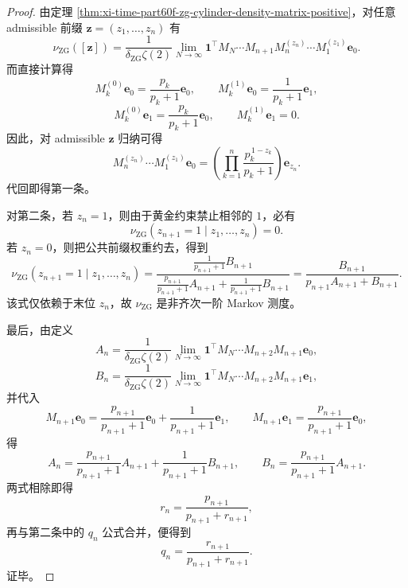 \begin{proof}
由定理 \ref{thm:xi-time-part60f-zg-cylinder-density-matrix-positive}，对任意 admissible 前缀 \(\mathbf z=(z_1,\dots,z_n)\) 有
\[
\nu_{\mathrm{ZG}}([\mathbf z])
=
\frac{1}{\delta_{\mathrm{ZG}}\zeta(2)}
\lim_{N\to\infty}
\mathbf 1^\top M_N\cdots M_{n+1}M_n^{(z_n)}\cdots M_1^{(z_1)}\mathbf e_0.
\]
而直接计算得
\[
M_k^{(0)}\mathbf e_0=\frac{p_k}{p_k+1}\mathbf e_0,\qquad
M_k^{(1)}\mathbf e_0=\frac{1}{p_k+1}\mathbf e_1,
\]
\[
M_k^{(0)}\mathbf e_1=\frac{p_k}{p_k+1}\mathbf e_0,\qquad
M_k^{(1)}\mathbf e_1=0.
\]
因此，对 admissible \(\mathbf z\) 归纳可得
\[
M_n^{(z_n)}\cdots M_1^{(z_1)}\mathbf e_0
=
\left(\prod_{k=1}^{n}\frac{p_k^{\,1-z_k}}{p_k+1}\right)\mathbf e_{z_n}.
\]
代回即得第一条。

对第二条，若 \(z_n=1\)，则由于黄金约束禁止相邻的 \(1\)，必有
\[
\nu_{\mathrm{ZG}}(z_{n+1}=1\mid z_1,\dots,z_n)=0.
\]
若 \(z_n=0\)，则把公共前缀权重约去，得到
\[
\nu_{\mathrm{ZG}}(z_{n+1}=1\mid z_1,\dots,z_n)
=
\frac{\frac{1}{p_{n+1}+1}B_{n+1}}
{\frac{p_{n+1}}{p_{n+1}+1}A_{n+1}+\frac{1}{p_{n+1}+1}B_{n+1}}
=
\frac{B_{n+1}}{p_{n+1}A_{n+1}+B_{n+1}}.
\]
该式仅依赖于末位 \(z_n\)，故 \(\nu_{\mathrm{ZG}}\) 是非齐次一阶 Markov 测度。

最后，由定义
\[
A_n=\frac{1}{\delta_{\mathrm{ZG}}\zeta(2)}
\lim_{N\to\infty}\mathbf 1^\top M_N\cdots M_{n+2}M_{n+1}\mathbf e_0,
\]
\[
B_n=\frac{1}{\delta_{\mathrm{ZG}}\zeta(2)}
\lim_{N\to\infty}\mathbf 1^\top M_N\cdots M_{n+2}M_{n+1}\mathbf e_1,
\]
并代入
\[
M_{n+1}\mathbf e_0
=
\frac{p_{n+1}}{p_{n+1}+1}\mathbf e_0
+\frac{1}{p_{n+1}+1}\mathbf e_1,
\qquad
M_{n+1}\mathbf e_1
=
\frac{p_{n+1}}{p_{n+1}+1}\mathbf e_0,
\]
得
\[
A_n=\frac{p_{n+1}}{p_{n+1}+1}A_{n+1}
+\frac{1}{p_{n+1}+1}B_{n+1},
\qquad
B_n=\frac{p_{n+1}}{p_{n+1}+1}A_{n+1}.
\]
两式相除即得
\[
r_n=\frac{p_{n+1}}{p_{n+1}+r_{n+1}},
\]
再与第二条中的 \(q_n\) 公式合并，便得到
\[
q_n=\frac{r_{n+1}}{p_{n+1}+r_{n+1}}.
\]
证毕。
\end{proof}




